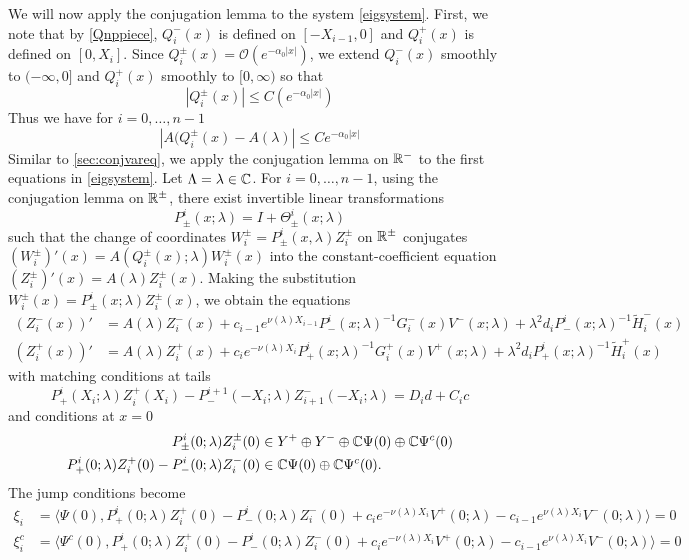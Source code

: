 \documentclass[thesis.tex]{subfiles}
\begin{document}
We will now apply the conjugation lemma to the system \cref{eigsystem}. First, we note that by \cref{Qnppiece}, $Q_i^-(x)$ is defined on $[-X_{i-1}, 0]$ and $Q_i^+(x)$ is defined on $[0, X_i]$. Since $Q_i^\pm(x) = \mathcal{O}(e^{-\alpha_0 |x|})$, we extend $Q_i^-(x)$ smoothly to $(-\infty, 0]$ and $Q_i^+(x)$ smoothly to $[0, \infty)$ so that
\[
|Q_i^\pm(x)| \leq C (e^{-\alpha_0 |x|})
\]
Thus we have for $i = 0, \dots, n-1$
\[
|A(Q_i^\pm(x) - A(\lambda)| \leq C e^{-\alpha_0 |x|}
\]
Similar to \cref{sec:conjvareq}, we apply the conjugation lemma on $\mathbb{R}^-$ to the first equations in \cref{eigsystem}. Let $\Lambda = \lambda \in \mathbb{C}$. For $i = 0, \dots, n-1$, using the conjugation lemma on $\mathbb{R}^\pm$, there exist invertible linear transformations 
\[
P^i_\pm(x; \lambda) = I + \Theta^i_\pm(x; \lambda)
\]
such that the change of coordinates $W_i^\pm = P^i_\pm(x, \lambda) Z_i^\pm$ on $\mathbb{R}^\pm$ conjugates $(W_i^\pm)'(x) = A(Q_i^\pm(x); \lambda) W_i^\pm(x)$ into the constant-coefficient equation $(Z_i^\pm)'(x) = A(\lambda) Z_i^\pm(x)$. Making the substitution $W_i^\pm(x) = P^i_\pm(x; \lambda) Z_i^\pm(x)$, we obtain the equations
\begin{equation}\label{systemZ}
\begin{aligned}
(Z_i^-(x))' &= A(\lambda) Z_i^-(x) + c_{i-1} e^{\nu(\lambda)X_{i-1}} P^i_-(x; \lambda)^{-1} G_i^-(x)V^-(x; \lambda) + \lambda^2 d_i P^i_-(x; \lambda)^{-1} \tilde{H}_i^-(x) \\
(Z_i^+(x))' &= A(\lambda) Z_i^+(x) + c_i e^{-\nu(\lambda)X_i} P^i_+(x; \lambda)^{-1} G_i^+(x)V^+(x; \lambda) + \lambda^2 d_i P^i_+(x; \lambda)^{-1} \tilde{H}_i^+(x)
\end{aligned}
\end{equation}
with matching conditions at tails
\begin{equation}\label{systemmiddle}
P^i_+(X_i; \lambda) Z_i^+(X_i) - P^{i+1}_-(-X_i; \lambda) Z_{i+1}^-(-X_i; \lambda) = D_i d + C_i c 
\end{equation}
and conditions at $x = 0$
\begin{align}
P^i_\pm(0; \lambda) Z_i^\pm(0) &\in Y^+ \oplus Y^- \oplus \mathbb{C} \Psi(0) \oplus \mathbb{C} \Psi^c(0) \label{systemcenter1} \\
P^i_+(0; \lambda) Z_i^+(0) - P^i_-(0; \lambda) Z_i^-(0) &\in \mathbb{C} \Psi(0) \oplus \mathbb{C} \Psi^c(0) \label{systemcenter2}.
\end{align}
The jump conditions become
\begin{equation}\label{jumpcondZ}
\begin{aligned}
\xi_i &= \langle \Psi(0), P^i_+(0; \lambda) Z_i^+(0) - P^i_-(0; \lambda) Z_i^-(0) + c_i e^{-\nu(\lambda)X_i}V^+(0; \lambda) - c_{i-1} e^{\nu(\lambda)X_i} V^-(0; \lambda) \rangle = 0  \\
\xi_i^c &= \langle \Psi^c(0), P^i_+(0; \lambda) Z_i^+(0) - P^i_-(0; \lambda) Z_i^-(0) + c_i e^{-\nu(\lambda)X_i}V^+(0; \lambda) - c_{i-1} e^{\nu(\lambda)X_i} V^-(0; \lambda) \rangle = 0 
\end{aligned}
\end{equation}
\end{document}
